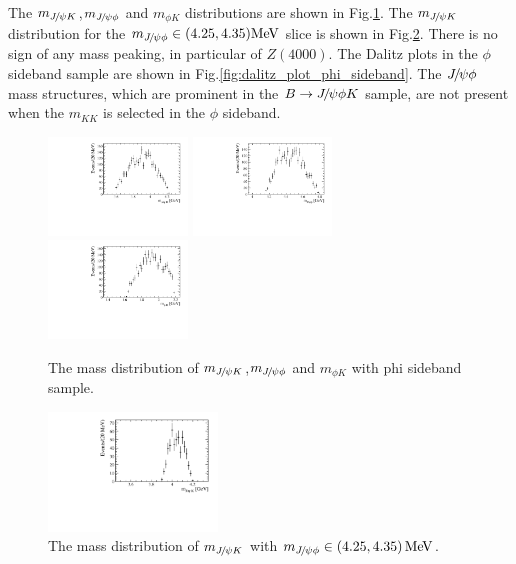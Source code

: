 The $m_{{{J\mskip -3mu/\mskip -2mu\psi}} K}$,$m_{{{J\mskip -3mu/\mskip -2mu\psi}} \phi}$
 and $m_{\phi K}$ distributions are shown in Fig.\ref{fig:mass_distribution_phi_sideband_2}.
The $m_{{{J\mskip -3mu/\mskip -2mu\psi}} K}$ distribution for the $m_{{{J\mskip -3mu/\mskip -2mu\psi}} \phi} \in (4.25,4.35)\mathrm{MeV}$ slice is shown in  Fig.\ref{fig:mjpsik_in_mjpsiphi_strip_2}.
There is no sign of any mass peaking, in particular of $Z(4000)$.
The Dalitz plots in the $\phi$ sideband sample are shown in Fig.\ref{fig:dalitz_plot_phi_sideband}.
The ${{J\mskip -3mu/\mskip -2mu\psi}}\phi$ mass structures, which are prominent in the $B\rightarrow{\ensuremath{{J\mskip -3mu/\mskip -2mu\psi}}}\phi K$ sample,
are not present when the $m_{KK}$ is selected in the $\phi$ sideband.

\begin{figure}[!hbtp]
\centering
\includegraphics[width=0.33\textwidth]{Figures/03_Zcs/app_non_phi/phi_sideband_mjpsik_1d.pdf}%
\includegraphics[width=0.33\textwidth]{Figures/03_Zcs/app_non_phi/phi_sideband_mjpsiphi_1d.pdf}
\includegraphics[width=0.33\textwidth]{Figures/03_Zcs/app_non_phi/phi_sideband_mphik_1d.pdf}%
\caption{The mass distribution of $m_{{{J\mskip -3mu/\mskip -2mu\psi}} K}$,$m_{{{J\mskip -3mu/\mskip -2mu\psi}} \phi}$
 and $m_{\phi K}$ with phi sideband sample.}
\label{fig:mass_distribution_phi_sideband_2}
\end{figure}

\begin{figure}[!hbtp]
\centering
\includegraphics[width=0.4\textwidth]{Figures/03_Zcs/app_non_phi/mjpsik_in_mjpsiphi_strip.pdf}%
\caption{The mass distribution of $m_{{{J\mskip -3mu/\mskip -2mu\psi}} K}$ with $m_{{{J\mskip -3mu/\mskip -2mu\psi}} \phi} \in (4.25,4.35)\text{\,Me\kern -0.1em V}$.}
\label{fig:mjpsik_in_mjpsiphi_strip_2}
\end{figure}


